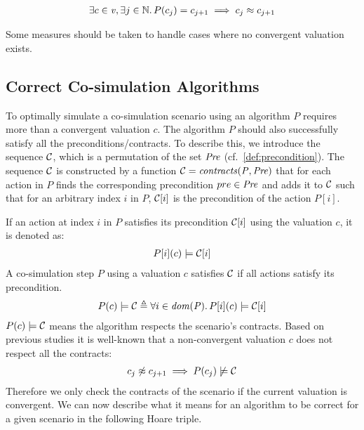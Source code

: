 \begin{align}
  \exists c \in \mathit{v}, \exists j \in \mathbb{N} \ldotp P(c_{j}) = c_{j+1} \implies c_{j} \approx c_{j+1}
\end{align}

Some measures should be taken to handle cases where no convergent valuation exists.

\subsection{Correct Co-simulation Algorithms}\label{sec:correctcosim}
To optimally simulate a co-simulation scenario using an algorithm $P$ requires more than a convergent valuation $c$. The algorithm $P$ should also successfully satisfy all the preconditions/contracts. To describe this, we introduce the sequence $\mathcal{C}$, which is a permutation of the set $\mathit{Pre}$ (cf.\ \cref{def:precondition}).
The sequence $\mathcal{C}$ is constructed by a function $\mathcal{C} = \mathit{contracts(P, \mathit{Pre})}$ that for each action in $P$ finds the corresponding precondition $pre \in \mathit{Pre}$ and adds it to $\mathcal{C}$ such that for an arbitrary index $i$ in $P$, $\mathcal{C}[i]$ is the precondition of the action $P[i]$.

If an action at index $i$ in $P$ satisfies its precondition $\mathcal{C}[i]$ using the valuation $c$, it is denoted as:
\begin{align}
  P[i](c) \models \mathcal{C}[i]
\end{align}
A co-simulation step $P$ using a valuation $c$ satisfies $\mathcal{C}$ if all actions satisfy its precondition. 
\begin{align}
  P(c) \models \mathcal{C} \triangleq \forall i \in \mathit{dom(P)} \ldotp P[i](c) \models \mathcal{C}[i]
\end{align}
$P(c) \models \mathcal{C}$ means the algorithm respects the scenario's contracts.
Based on previous studies it is well-known that a non-convergent valuation $c$ does not respect all the contracts:
\begin{align}\label{eq:incorrectConf}
  c_j \not\approx c_{j+1} \implies P(c_j) \not\models \mathcal{C}
\end{align}
Therefore we only check the contracts of the scenario if the current valuation is convergent.
We can now describe what it means for an algorithm to be correct for a given scenario in the following Hoare triple.

